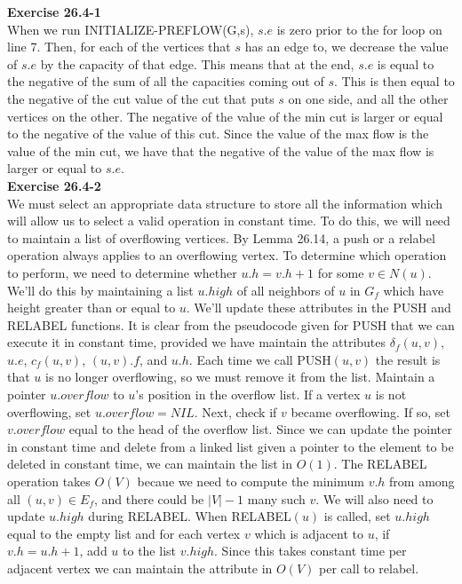 \documentclass{article}
\begin{document}
\noindent\textbf{Exercise 26.4-1}\\

When we run INITIALIZE-PREFLOW(G,s), $s.e$ is zero prior to the for loop on line 7. Then, for each of the vertices that $s$ has an edge to, we decrease the value of $s.e$ by the capacity of that edge. This means that at the end, $s.e$ is equal to the negative of the sum of all the capacities coming out of $s$. This is then equal to the negative of the cut value of the cut that puts $s$ on one side, and all the other vertices on the other. The negative of the value of the min cut is larger or equal to the negative of the value of this cut. Since the value of the max flow is the value of the min cut, we have that the negative of the value of the max flow is larger or equal to $s.e$.\\


\noindent\textbf{Exercise 26.4-2}\\

We must select an appropriate data structure to store all the information which will allow us to select a valid operation in constant time.  To do this, we will need to maintain a list of overflowing vertices.  By Lemma 26.14, a push or a relabel operation always applies to an overflowing vertex.  To determine which operation to perform, we need to determine whether $u.h = v.h+1$ for some $v \in N(u)$.  We'll do this by maintaining a list $u.high$ of all neighbors of $u$ in $G_f$ which have height greater than or equal to $u$.   We'll update these attributes in the PUSH and RELABEL functions.  It is clear from the pseudocode given for PUSH that we can execute it in constant time, provided we have maintain the attributes $\delta_f(u,v)$, $u.e$, $c_f(u,v)$, $(u,v).f$, and $u.h$.  Each time we call PUSH$(u,v)$ the result is that $u$ is no longer overflowing, so we must remove it from the list.  Maintain a pointer $u.overflow$ to $u$'s position in the overflow list.  If a vertex $u$ is not overflowing, set $u.overflow = NIL$.  Next, check if $v$ became overflowing.   If so, set $v.overflow$ equal to the head of the overflow list. Since we can update the pointer in constant time and delete from a linked list given a pointer to the element to be deleted in constant time, we can maintain the list in $O(1)$.  The RELABEL operation takes $O(V)$ becaue we need to compute the minimum $v.h$ from among all $(u,v) \in E_f$, and there could be $|V|-1$ many such $v$. We will also need to update $u.high$ during RELABEL.  When RELABEL$(u)$ is called, set $u.high$ equal to the empty list and for each vertex $v$ which is adjacent to $u$, if $v.h = u.h + 1$, add $u$ to the list $v.high$.  Since this takes constant time per adjacent vertex we can maintain the attribute in $O(V)$ per call to relabel.\\
\end{document}
